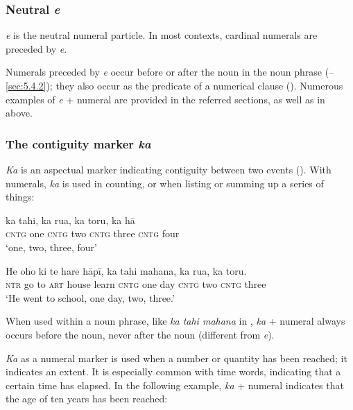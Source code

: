 \subsubsection[Neutral e]{Neutral \textit{e}}\label{sec:4.3.2.1}

\textit{e} is the neutral numeral particle. In most contexts, cardinal numerals are preceded by \textit{e}. 

Numerals preceded by \textit{e} occur before or after the noun in the noun phrase (–\ref{sec:5.4.2}); they also occur as the predicate of a numerical clause (). Numerous examples of \textit{e} + numeral are provided in the referred sections, as well as in  above.

\subsubsection[The contiguity marker ka]{The contiguity marker \textit{ka}}\label{sec:4.3.2.2}

\textit{Ka} is an aspectual marker indicating contiguity between two events (). With numerals, \textit{ka} is used in counting, or when listing or summing up a series of things:

\ea\label{ex:4.25}
\gll ka tahi, ka rua, ka toru, ka hā \\
\textsc{cntg} one \textsc{cntg} two \textsc{cntg} three \textsc{cntg} four \\

\glt 
‘one, two, three, four’
\z

\ea\label{ex:4.26}
\gll He oho ki te hare hāpī, ka tahi mahana, ka rua, ka toru. \\
\textsc{ntr} go to \textsc{art} house learn \textsc{cntg} one day \textsc{cntg} two \textsc{cntg} three \\

\glt
‘He went to school, one day, two, three.’ \textstyleExampleref{[R399.013]}  
\z

When used within a noun phrase, like \textit{ka tahi mahana} in , \textit{ka} + numeral always occurs before the noun, never after the noun (different from \textit{e}). 

\textit{Ka} as a numeral marker is used when a number or quantity has been reached; it indicates an extent. It is especially common with time words, indicating that a certain time has elapsed. In the following example, \textit{ka} + numeral indicates that the age of ten years has been reached:

